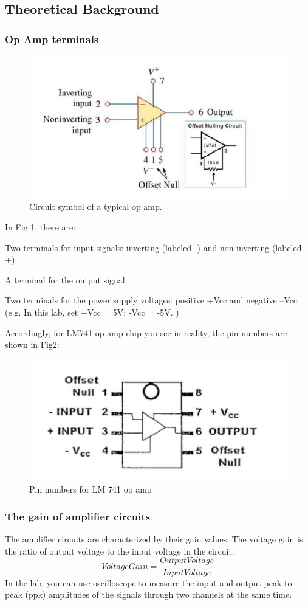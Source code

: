\documentclass{article}
\begin{document}
\subsection{Theoretical Background}
\subsubsection{Op Amp terminals}
\begin{figure}[H]
	\centering
	\includegraphics[width=0.7\linewidth]{pic1}
	\caption{Circuit symbol of a typical op amp.}
	\label{fig:pic1}
\end{figure}
In Fig 1, there are:

Two terminals for input signals: inverting (labeled -) and non-inverting (labeled +)

A terminal for the output signal.

Two terminals for the power supply voltages: positive +Vcc and negative –Vcc. (e.g.
In this lab, set +Vcc = 5V; -Vcc = -5V. )

Accordingly, for LM741 op amp chip you see in reality, the pin numbers are shown in
Fig2:
\begin{figure}[H]
	\centering
	\includegraphics[width=0.7\linewidth]{pic2}
	\caption{Pin numbers for LM 741 op amp}
	\label{fig:pic2}
\end{figure}
\subsubsection{The gain of amplifier circuits}
The amplifier circuits are characterized by their gain values. The voltage gain is the
ratio of output voltage to the input voltage in the circuit:
$$VoltageGain=\frac{OutputVoltage}{InputVoltage}$$
In the lab, you can use oscilloscope to measure the input and output peak-to-peak (ppk)
amplitudes of the signals through two channels at the same time.
\end{document}

